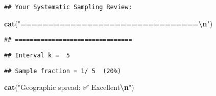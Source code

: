 \documentclass[
]{article}
\newenvironment{Shaded}{\begin{snugshade}}{\end{snugshade}}
\newcommand{\FunctionTok}[1]{\textcolor[rgb]{0.13,0.29,0.53}{\textbf{#1}}}
\newcommand{\NormalTok}[1]{#1}
\newcommand{\SpecialCharTok}[1]{\textcolor[rgb]{0.81,0.36,0.00}{\textbf{#1}}}
\newcommand{\StringTok}[1]{\textcolor[rgb]{0.31,0.60,0.02}{#1}}
\begin{document}
\begin{verbatim}
## Your Systematic Sampling Review:
\end{verbatim}

\begin{Shaded}
\begin{Highlighting}[]
\FunctionTok{cat}\NormalTok{(}\StringTok{"================================}\SpecialCharTok{\textbackslash{}n}\StringTok{"}\NormalTok{)}
\end{Highlighting}
\end{Shaded}

\begin{verbatim}
## ================================
\end{verbatim}

\begin{Shaded}
\end{Shaded}

\begin{verbatim}
## Interval k =  5
\end{verbatim}

\begin{Shaded}
\end{Shaded}

\begin{verbatim}
## Sample fraction = 1/ 5  (20%)
\end{verbatim}

\begin{Shaded}
\begin{Highlighting}[]
\FunctionTok{cat}\NormalTok{(}\StringTok{"Geographic spread: ✅ Excellent}\SpecialCharTok{\textbackslash{}n}\StringTok{"}\NormalTok{)}
\end{Highlighting}
\end{Shaded}
\end{document}
